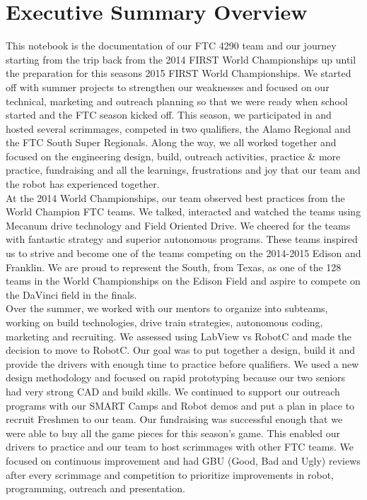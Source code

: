\section{Executive Summary Overview}
This notebook is the documentation of our FTC 4290 team and our journey starting from the trip back from the 2014 FIRST World Championships up until the preparation for this seasons 2015 FIRST World Championships.  We started off with summer projects to strengthen our weaknesses and focused on our technical, marketing and outreach planning so that we were ready when school started and the FTC season kicked off.  This season, we participated in and hosted several scrimmages, competed in two qualifiers, the Alamo Regional and the FTC South Super Regionals.  Along the way, we all worked together and focused on the engineering design, build, outreach activities, practice \& more practice, fundraising and all the learnings, frustrations and joy that our team and the robot has experienced together.\\

At the 2014 World Championships, our team observed best practices from the World Champion FTC teams. We talked, interacted and watched the teams using Mecanum drive technology and Field Oriented Drive. We cheered for the teams with fantastic strategy and superior autonomous programs. These teams inspired us to strive and become one of the teams competing on the 2014-2015 Edison and Franklin.  We are proud to represent the South, from Texas, as one of the 128 teams in the World Championships on the Edison Field and aspire to compete on the DaVinci field in the finals.\\

Over the summer, we worked with our mentors to organize into subteams, working on build technologies, drive train strategies, autonomous coding, marketing and recruiting. We assessed using LabView vs RobotC and made the decision to move to RobotC. Our goal was to put together a design, build it and provide the drivers with enough time to practice before qualifiers. We used a new design methodology and focused on rapid prototyping because our two seniors had very strong CAD and build skills. We continued to support our outreach programs with our SMART Camps and Robot demos and put a plan in place to recruit Freshmen to our team. Our fundraising was successful enough that we were able to buy all the game pieces for this season’s game.  This enabled our drivers to practice and our team to host scrimmages with other FTC teams.  We focused on continuous improvement and had GBU (Good, Bad and Ugly) reviews after every scrimmage and competition to prioritize improvements in robot, programming, outreach and presentation.\\

